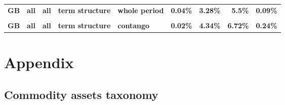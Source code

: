 \documentclass[
  authoryear,
  preprint,
  3p]{elsarticle}
\begin{document}
\begin{landscape}
\begin{longtable}[t]{>{}l>{}l>{}l>{}l>{}l>{}r>{}r>{}r>{}r}
\textbf{GB} & \textbf{all} & \textbf{all} & \textbf{term structure} & \textbf{whole period} & \textcolor[HTML]{4285f4}{\textbf{0.04\%}} & \textcolor[HTML]{4285f4}{\textbf{3.28\%}} & \textcolor[HTML]{4285f4}{\textbf{5.5\%}} & \textcolor[HTML]{4285f4}{\textbf{0.09\%}}\\
\textbf{\cellcolor{gray!10}{GB}} & \textbf{\cellcolor{gray!10}{all}} & \textbf{\cellcolor{gray!10}{all}} & \textbf{\cellcolor{gray!10}{term structure}} & \textbf{\cellcolor{gray!10}{backwardation}} & \textcolor[HTML]{4285f4}{\textbf{\cellcolor{gray!10}{0.17\%}}} & \textcolor[HTML]{4285f4}{\textbf{\cellcolor{gray!10}{2.37\%}}} & \textcolor[HTML]{4285f4}{\textbf{\cellcolor{gray!10}{3.67\%}}} & \textcolor[HTML]{4285f4}{\textbf{\cellcolor{gray!10}{0.09\%}}}\\
\addlinespace
\textbf{GB} & \textbf{all} & \textbf{all} & \textbf{term structure} & \textbf{contango} & \textcolor[HTML]{4285f4}{\textbf{0.02\%}} & \textcolor[HTML]{4285f4}{\textbf{4.34\%}} & \textcolor[HTML]{4285f4}{\textbf{6.72\%}} & \textcolor[HTML]{4285f4}{\textbf{0.24\%}}\\
\bottomrule

\end{longtable}

\endgroup{}
\end{landscape}

\newpage

\section{Appendix}\label{appendix}

\subsection{Commodity assets taxonomy}\label{sec-taxonomy}

\begingroup\fontsize{7}{9}\selectfont
\end{document}
